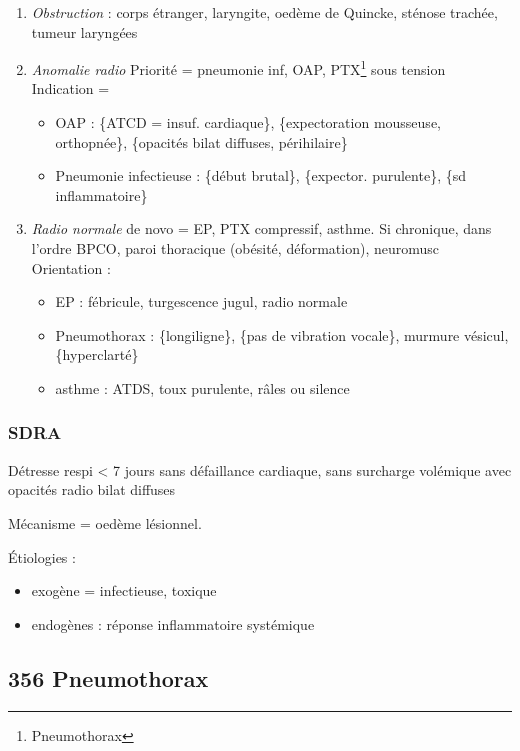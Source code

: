 \documentclass[11pt]{article}
\begin{document}
\begin{enumerate}
\item \emph{Obstruction}  : corps étranger, laryngite, oedème de Quincke, sténose
trachée, tumeur laryngées
\item \emph{Anomalie radio} Priorité = pneumonie inf, OAP,
PTX\footnote{Pneumothorax} sous
tension\\
Indication =

\begin{itemize}
\item OAP : \{ATCD = insuf. cardiaque\}, \{expectoration mousseuse, orthopnée\},
\{opacités bilat diffuses, périhilaire\}
\item Pneumonie infectieuse : \{début brutal\}, \{expector. purulente\}, \{sd
inflammatoire\}
\end{itemize}

\item \emph{Radio normale} de novo = EP, PTX compressif, asthme. Si
chronique, dans l'ordre BPCO, paroi thoracique (obésité, déformation),
neuromusc\\
Orientation :

\begin{itemize}
\item EP : fébricule, turgescence jugul, radio normale
\item Pneumothorax : \{longiligne\}, \{pas de vibration vocale\}, murmure vésicul,
\{hyperclarté\}
\item asthme : ATDS, toux purulente, râles ou silence
\end{itemize}
\end{enumerate}

\subsubsection{SDRA}
\label{sec:orge803ab9}
Détresse respi < 7 jours sans défaillance cardiaque, sans surcharge volémique
avec opacités radio bilat diffuses

Mécanisme = oedème lésionnel.

Étiologies :

\begin{itemize}
\item exogène = infectieuse, toxique
\item endogènes : réponse inflammatoire systémique
\end{itemize}


\subsection{356 \textdagger{} Pneumothorax}
\label{sec:orga05665b}
\end{document}
